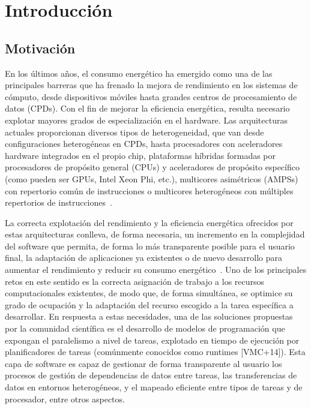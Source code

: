 \cleardoublepage


\chapter{Introducción}
\label{ch:chapter1}

\section{Motivación}
En los últimos años, el consumo energético ha emergido como una de las
principales barreras que ha frenado la mejora de rendimiento en los
sistemas de cómputo, desde dispositivos móviles hasta grandes centros de
procesamiento de datos (CPDs). Con el fin de mejorar la eficiencia
energética, resulta necesario explotar mayores grados de especialización en
el hardware. Las arquitecturas actuales proporcionan diversos tipos de
heterogeneidad, que van desde configuraciones heterogéneas en CPDs, hasta
procesadores con aceleradores hardware integrados en el propio chip,
plataformas híbridas formadas por procesadores de propósito general (CPUs)
y aceleradores de propósito específico (como pueden ser GPUs, Intel Xeon
Phi, etc.), multicores asimétricos (AMPSs) con repertorio común de
instrucciones o multicores heterogéneos con múltiples repertorios de
instrucciones~\cite{FuMi11,KoSh13}.

La correcta explotación del rendimiento y la eficiencia energética
ofrecidos por estas arquitecturas conlleva, de forma necesaria, un
incremento en la complejidad del software que permita, de forma lo más
transparente posible para el usuario final, la adaptación de aplicaciones
ya existentes o de nuevo desarrollo para aumentar el rendimiento y reducir
su consumo energético~\cite{OsTo10,SKC+15}. Uno de los principales retos en
este sentido es la correcta asignación de trabajo a los recursos
computacionales existentes, de modo que, de forma simultánea, se optimice
su grado de ocupación y la adaptación del recurso escogido a la tarea
específica a desarrollar. En respuesta a estas necesidades, una de las
soluciones propuestas por la comunidad científica es el desarrollo de
modelos de programación que expongan el paralelismo a nivel de tareas,
explotado en tiempo de ejecución por planificadores de tareas (comúnmente
conocidos como runtimes [VMC+14]). Esta capa de software es capaz de
gestionar de forma transparente al usuario los procesos de gestión de
dependencias de datos entre tareas, las transferencias de datos en entornos
heterogéneos, y el mapeado eficiente entre tipos de tareas y de procesador,
entre otros aspectos.

